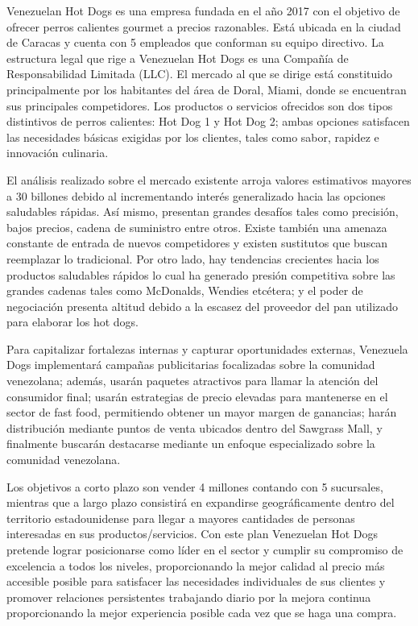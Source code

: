 
                Venezuelan Hot Dogs es una empresa fundada en el año 2017 con el objetivo de ofrecer perros calientes gourmet a precios razonables. Está ubicada en la ciudad de Caracas y cuenta con 5 empleados que conforman su equipo directivo. La estructura legal que rige a Venezuelan Hot Dogs es una Compañía de Responsabilidad Limitada (LLC). El mercado al que se dirige está constituido principalmente por los habitantes del área de Doral, Miami, donde se encuentran sus principales competidores. Los productos o servicios ofrecidos son dos tipos distintivos de perros calientes: Hot Dog 1 y Hot Dog 2; ambas opciones satisfacen las necesidades básicas exigidas por los clientes, tales como sabor, rapidez e innovación culinaria.

                El análisis realizado sobre el mercado existente arroja valores estimativos mayores a 30 billones debido al incrementando interés generalizado hacia las opciones saludables rápidas. Así mismo, presentan grandes desafíos tales como precisión, bajos precios, cadena de suministro entre otros. Existe también una amenaza constante de entrada de nuevos competidores y existen sustitutos que buscan reemplazar lo tradicional. Por otro lado, hay tendencias crecientes hacia los productos saludables rápidos lo cual ha generado presión competitiva sobre las grandes cadenas tales como McDonalds, Wendies etcétera; y el poder de negociación presenta altitud debido a la escasez del proveedor del pan utilizado para elaborar los hot dogs.

                Para capitalizar fortalezas internas y capturar oportunidades externas, Venezuela Dogs implementará campañas publicitarias focalizadas sobre la comunidad venezolana; además, usarán paquetes atractivos para llamar la atención del consumidor final; usarán estrategias de precio elevadas para mantenerse en el sector de fast food, permitiendo obtener un mayor margen de ganancias; harán distribución mediante puntos de venta ubicados dentro del Sawgrass Mall, y finalmente buscarán destacarse mediante un enfoque especializado sobre la comunidad venezolana.

                Los objetivos a corto plazo son vender 4 millones contando con 5 sucursales, mientras que a largo plazo consistirá en expandirse geográficamente dentro del territorio estadounidense para llegar a mayores cantidades de personas interesadas en sus productos/servicios. Con este plan Venezuelan Hot Dogs pretende lograr posicionarse como líder en el sector y cumplir su compromiso de excelencia a todos los niveles, proporcionando la mejor calidad al precio más accesible posible para satisfacer las necesidades individuales de sus clientes y promover relaciones persistentes trabajando diario por la mejora continua proporcionando la mejor experiencia posible cada vez que se haga una compra.
